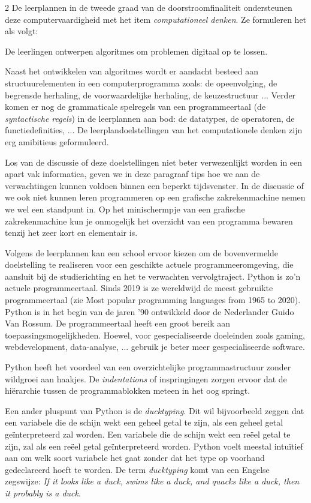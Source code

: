 \begin{multicols}{2}
	De leerplannen in de tweede graad van de doorstroomfinaliteit ondersteunen deze computervaardigheid met het item \emph{computationeel denken}. Ze formuleren het als volgt:
	
	\begin{citaat}
		De leerlingen ontwerpen algoritmes om problemen digitaal op te lossen.
	\end{citaat}
	
	Naast het ontwikkelen van algoritmes wordt er aandacht besteed aan structuurelementen in een computerprogramma zoals: de opeenvolging, de begrensde herhaling, de voorwaardelijke herhaling, de keuzestructuur ... Verder komen er nog de grammaticale spelregels van een programmeertaal (de \emph{syntactische regels}) in de leerplannen aan bod: de datatypes, de operatoren, de functiedefinities, ... De leerplandoelstellingen van het computationele denken zijn erg amibitieus geformuleerd. 
	
	Los van de discussie of deze doelstellingen niet beter verwezenlijkt worden in een apart vak informatica, geven we in deze paragraaf tips hoe we aan de verwachtingen kunnen voldoen binnen een beperkt tijdsvenster. In de discussie of we ook niet kunnen leren programmeren op een grafische zakrekenmachine nemen we wel een standpunt in. Op het minischermpje van een grafische zakrekenmachine kun je onmogelijk het overzicht van een programma bewaren tenzij het zeer kort en elementair is.
	
	Volgens de leerplannen kan een school ervoor kiezen om de bovenvermelde doelstelling te realiseren voor een geschikte actuele programmeeromgeving, die aansluit bij de studierichting en het te verwachten vervolgtraject. Python is zo'n actuele programmeertaal. Sinds 2019 is ze wereldwijd de meest gebruikte programmeertaal (zie Most popular programming languages from 1965 to 2020). Python is in het begin van de jaren '90 ontwikkeld door de Nederlander Guido Van Rossum. De programmeertaal heeft een groot bereik aan toepassingsmogelijkheden. Hoewel, voor gespecialiseerde doeleinden zoals gaming, webdevelopment, data-analyse, ... gebruik je beter meer gespecialiseerde software.
    
    Python heeft het voordeel van een overzichtelijke programmastructuur zonder wildgroei aan haakjes. De \emph{indentations} of inspringingen zorgen ervoor dat de hiërarchie tussen de programmablokken meteen in het oog springt. 
    
    Een ander pluspunt van Python is de \emph{ducktyping}. Dit wil bijvoorbeeld zeggen dat een variabele die de schijn wekt een geheel getal te zijn, als een geheel getal geïnterpreteerd zal worden. Een variabele die de schijn wekt een reëel getal te zijn, zal als een reëel getal geïnterpreteerd worden. Python voelt meestal intuïtief aan om welk soort variabele het gaat zonder dat het type op voorhand gedeclareerd hoeft te worden. De term \emph{ducktyping} komt van een Engelse zegswijze: \emph{If it looks like a duck, swims like a duck, and quacks like a duck, then it probably is a duck}.
    

\end{multicols}
